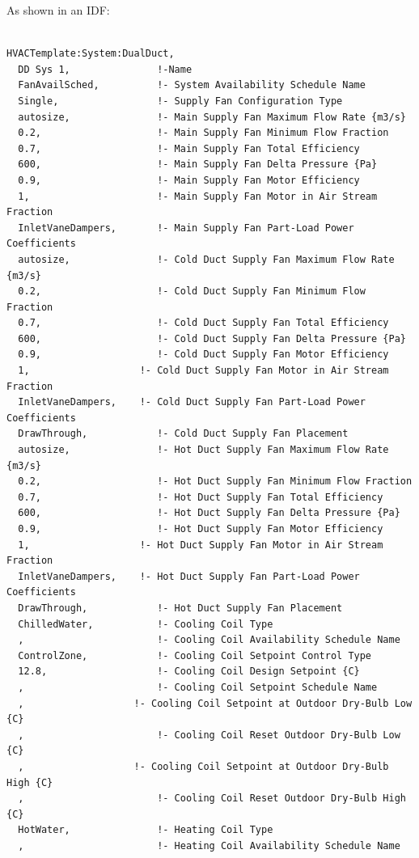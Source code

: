 As shown in an IDF:

\begin{lstlisting}

HVACTemplate:System:DualDuct,
  DD Sys 1,               !-Name
  FanAvailSched,          !- System Availability Schedule Name
  Single,                 !- Supply Fan Configuration Type
  autosize,               !- Main Supply Fan Maximum Flow Rate {m3/s}
  0.2,                    !- Main Supply Fan Minimum Flow Fraction
  0.7,                    !- Main Supply Fan Total Efficiency
  600,                    !- Main Supply Fan Delta Pressure {Pa}
  0.9,                    !- Main Supply Fan Motor Efficiency
  1,                      !- Main Supply Fan Motor in Air Stream Fraction
  InletVaneDampers,       !- Main Supply Fan Part-Load Power Coefficients
  autosize,               !- Cold Duct Supply Fan Maximum Flow Rate {m3/s}
  0.2,                    !- Cold Duct Supply Fan Minimum Flow Fraction
  0.7,                    !- Cold Duct Supply Fan Total Efficiency
  600,                    !- Cold Duct Supply Fan Delta Pressure {Pa}
  0.9,                    !- Cold Duct Supply Fan Motor Efficiency
  1,                   !- Cold Duct Supply Fan Motor in Air Stream Fraction
  InletVaneDampers,    !- Cold Duct Supply Fan Part-Load Power Coefficients
  DrawThrough,            !- Cold Duct Supply Fan Placement
  autosize,               !- Hot Duct Supply Fan Maximum Flow Rate {m3/s}
  0.2,                    !- Hot Duct Supply Fan Minimum Flow Fraction
  0.7,                    !- Hot Duct Supply Fan Total Efficiency
  600,                    !- Hot Duct Supply Fan Delta Pressure {Pa}
  0.9,                    !- Hot Duct Supply Fan Motor Efficiency
  1,                   !- Hot Duct Supply Fan Motor in Air Stream Fraction
  InletVaneDampers,    !- Hot Duct Supply Fan Part-Load Power Coefficients
  DrawThrough,            !- Hot Duct Supply Fan Placement
  ChilledWater,           !- Cooling Coil Type
  ,                       !- Cooling Coil Availability Schedule Name
  ControlZone,            !- Cooling Coil Setpoint Control Type
  12.8,                   !- Cooling Coil Design Setpoint {C}
  ,                       !- Cooling Coil Setpoint Schedule Name
  ,                   !- Cooling Coil Setpoint at Outdoor Dry-Bulb Low {C}
  ,                       !- Cooling Coil Reset Outdoor Dry-Bulb Low {C}
  ,                   !- Cooling Coil Setpoint at Outdoor Dry-Bulb High {C}
  ,                       !- Cooling Coil Reset Outdoor Dry-Bulb High {C}
  HotWater,               !- Heating Coil Type
  ,                       !- Heating Coil Availability Schedule Name

\end{lstlisting}
